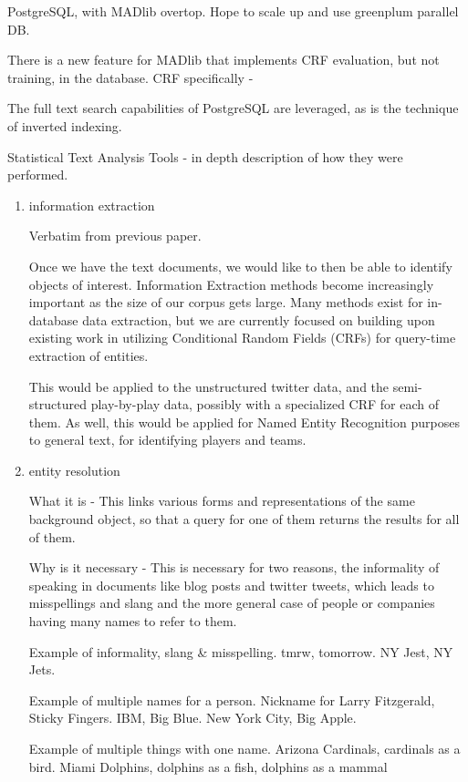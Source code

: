 \documentclass{article}
\begin{document}
\begin{enumerate}
  PostgreSQL, with MADlib overtop.
  Hope to scale up and use greenplum parallel DB.

  There is a new feature for MADlib that implements CRF evaluation, but not training, in the database.
  CRF specifically -

  The full text search capabilities of PostgreSQL are leveraged,
  as is the technique of inverted indexing.


  Statistical Text Analysis Tools - in depth description of how they were performed.
  \begin{enumerate}
  \item information extraction

    Verbatim from previous paper.

    Once we have the text documents, we would like to then be able to identify
    objects of interest. Information Extraction methods become increasingly
    important as the size of our corpus gets large. Many methods exist for in-database data
    extraction, but we are currently focused on building upon existing work in
    utilizing Conditional Random Fields (CRFs) for query-time extraction of
    entities.

    This would be applied to the unstructured twitter data,
    and the semi-structured play-by-play data,
    possibly with a specialized CRF for each of them.
    As well, this would be applied for Named Entity Recognition purposes to general text, for identifying players and teams.

  \item entity resolution

    What it is -
    This links various forms and representations of the same background object,
    so that a query for one of them returns the results for all of them.

    Why is it necessary -
    This is necessary for two reasons,
    the informality of speaking in documents like blog posts and twitter tweets,
    which leads to misspellings and slang
    and the more  general case of people or companies having many names to refer to them.

    Example of informality, slang \& misspelling. tmrw, tomorrow. NY Jest, NY Jets.

    Example of multiple names for a person. Nickname for Larry Fitzgerald, Sticky Fingers. IBM, Big Blue. New York City, Big Apple.

    Example of multiple things with one name.
    Arizona Cardinals, cardinals as a bird.
    Miami Dolphins, dolphins as a fish, dolphins as a mammal


\end{enumerate}
\end{enumerate}
\end{document}
